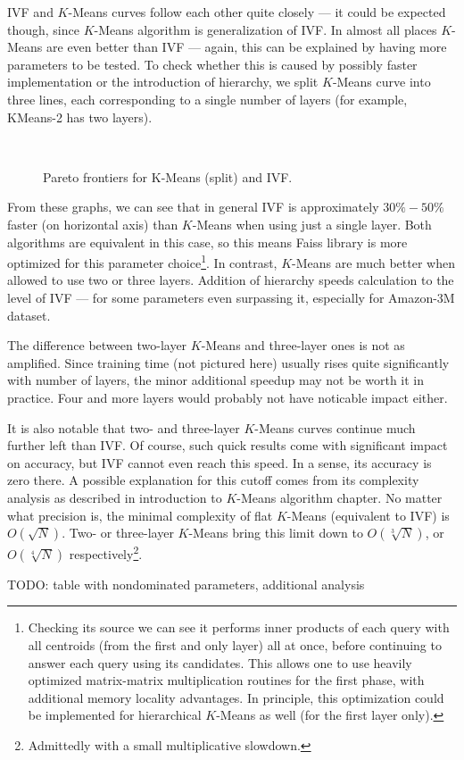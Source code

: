 IVF and $K$-Means curves follow each other quite closely --- it could be expected though,
since $K$-Means algorithm is generalization of IVF. In almost all places $K$-Means are even
better than IVF --- again, this can be explained by having more parameters to be tested.
To check whether this is caused by possibly faster implementation or the introduction of
hierarchy, we split $K$-Means curve into three lines, each corresponding to a single
number of layers (for example, KMeans-2 has two layers).

\begin{figure}[H]
	\centering
	\\
	\caption{Pareto frontiers for K-Means (split) and IVF.}
\end{figure}

From these graphs, we can see that in general IVF is approximately $30\% - 50\%$ faster
(on horizontal axis) than $K$-Means when using just a single layer. Both algorithms are
equivalent in this case, so this means Faiss library is more optimized for this parameter 
choice\footnote{
Checking its source we can see it performs inner products of each query with all centroids
(from the first and only layer) all at once, before continuing to answer each query 
using its candidates. This allows one to use heavily optimized matrix-matrix multiplication
routines for the first phase, with additional memory locality advantages. 
In principle, this optimization
could be implemented for hierarchical $K$-Means as well (for the first layer only).
}.
In contrast, $K$-Means are much better when allowed to use two or three layers. Addition
of hierarchy speeds calculation to the level of IVF --- for some parameters even surpassing
it, especially for Amazon-3M dataset.

The difference between two-layer $K$-Means and three-layer ones is not as amplified. Since
training time (not pictured here) usually rises quite significantly with number of layers,
the minor additional speedup may not be worth it in practice. Four and more layers
would probably not have noticable impact either.

It is also notable that two- and three-layer $K$-Means curves continue much further left
than IVF. Of course, such quick results come with significant impact on accuracy, but
IVF cannot even reach this speed. In a sense, its accuracy is zero there.
A possible explanation for this cutoff comes from its complexity analysis as described
in introduction to $K$-Means algorithm chapter. No matter what precision is, the minimal
complexity of flat $K$-Means (equivalent to IVF) is $O(\sqrt{N})$. Two- or three-layer
$K$-Means bring this limit down to $O(\sqrt[3]{N})$, or $O(\sqrt[4]{N})$
respectively\footnote{Admittedly with a small multiplicative slowdown.}.

TODO: table with nondominated parameters, additional analysis
\newpage
